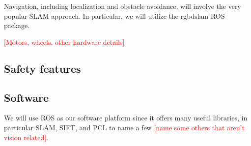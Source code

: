 \documentclass{paper}
\newcommand \todo[1]{\textcolor{red}{[#1]}}
\begin{document}
	Navigation, including localization and obstacle avoidance, will involve the very popular SLAM approach.  In particular, we will utilize the rgbdslam ROS package.  

	\todo{Motors, wheels, other hardware details}

\subsection*{Safety features}





\subsection*{Software}

	We will use ROS as our software platform since it offers many useful libraries, in particular SLAM, SIFT, and PCL to name a few \todo{name some others that aren't vision related}.    
\end{document}
